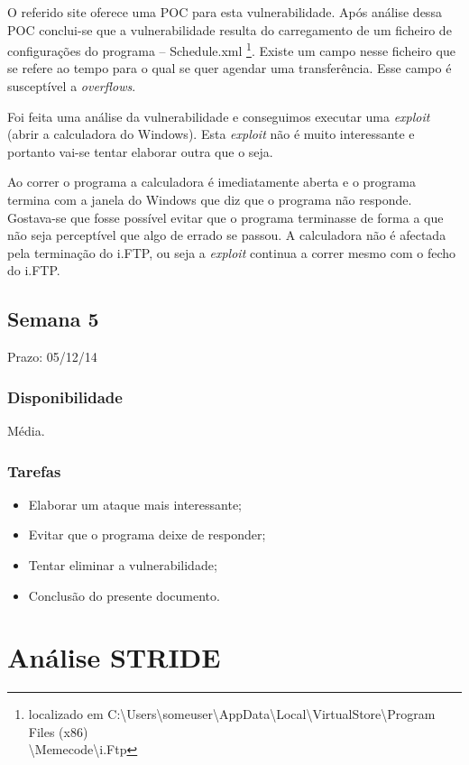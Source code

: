 \documentclass[a4paper]{article}
\begin{document}
O referido site oferece uma POC para esta vulnerabilidade. Após análise dessa POC conclui-se que a vulnerabilidade resulta do carregamento de um ficheiro de configurações do programa -- Schedule.xml \footnote{localizado em C:\textbackslash Users\textbackslash someuser\textbackslash AppData\textbackslash Local\textbackslash VirtualStore\textbackslash Program Files (x86)\\ \textbackslash Memecode\textbackslash i.Ftp}. Existe um campo nesse ficheiro que se refere ao tempo para o qual se quer agendar uma transferência. Esse campo é susceptível a \textit{overflows}.

Foi feita uma análise da vulnerabilidade e conseguimos executar uma \textit{exploit} (abrir a calculadora do Windows). Esta \textit{exploit} não é muito interessante e portanto vai-se tentar elaborar outra que o seja.

Ao correr o programa a calculadora é imediatamente aberta e o programa termina com a janela do Windows que diz que o programa não responde. Gostava-se que fosse possível evitar que o programa terminasse de forma a que não seja perceptível que algo de errado se passou. A calculadora não é afectada pela terminação do i.FTP, ou seja a \textit{exploit} continua a correr mesmo com o fecho do i.FTP.


\subsection{Semana 5}
Prazo: 05/12/14
\subsubsection{Disponibilidade}
Média.
\subsubsection{Tarefas}
\begin{itemize}
	\item Elaborar um ataque mais interessante;
	\item Evitar que o programa deixe de responder;
	\item Tentar eliminar a vulnerabilidade;
	\item Conclusão do presente documento.
\end{itemize}

\section{Análise STRIDE}
\end{document}
